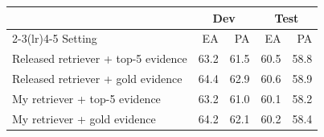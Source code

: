 \begin{tabular}{lrrrr}
\toprule
 & \multicolumn{2}{c}{Dev} & \multicolumn{2}{c}{Test} \\
\cmidrule(lr){2-3}\cmidrule(lr){4-5}
Setting & EA & PA & EA & PA \\
\midrule
Released retriever + top-5 evidence & 63.2 & 61.5 & 60.5 & 58.8 \\
Released retriever + gold evidence & 64.4 & 62.9 & 60.6 & 58.9 \\
My retriever + top-5 evidence & 63.2 & 61.0 & 60.1 & 58.2 \\
My retriever + gold evidence & 64.2 & 62.1 & 60.2 & 58.4 \\
\bottomrule
\end{tabular}
